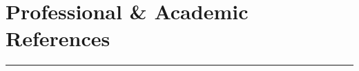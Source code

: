 \documentclass[10pt]{article}
\begin{document}


\section*{Professional \& Academic References}
\label{sec:references}
\vspace{-.1in}
\hrule
\vspace{.3in}


%
%
%

\pagestyle{empty}
\end{document}
